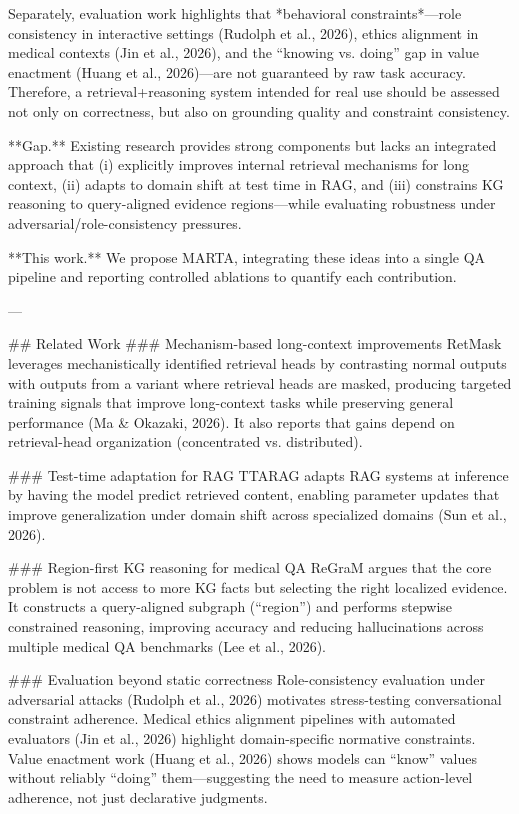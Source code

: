 Separately, evaluation work highlights that *behavioral constraints*—role consistency in interactive settings (Rudolph et al., 2026), ethics alignment in medical contexts (Jin et al., 2026), and the “knowing vs. doing” gap in value enactment (Huang et al., 2026)—are not guaranteed by raw task accuracy. Therefore, a retrieval+reasoning system intended for real use should be assessed not only on correctness, but also on grounding quality and constraint consistency.

**Gap.** Existing research provides strong components but lacks an integrated approach that (i) explicitly improves internal retrieval mechanisms for long context, (ii) adapts to domain shift at test time in RAG, and (iii) constrains KG reasoning to query-aligned evidence regions—while evaluating robustness under adversarial/role-consistency pressures.

**This work.** We propose MARTA, integrating these ideas into a single QA pipeline and reporting controlled ablations to quantify each contribution.

---

## Related Work  
### Mechanism-based long-context improvements  
RetMask leverages mechanistically identified retrieval heads by contrasting normal outputs with outputs from a variant where retrieval heads are masked, producing targeted training signals that improve long-context tasks while preserving general performance (Ma & Okazaki, 2026). It also reports that gains depend on retrieval-head organization (concentrated vs. distributed).

### Test-time adaptation for RAG  
TTARAG adapts RAG systems at inference by having the model predict retrieved content, enabling parameter updates that improve generalization under domain shift across specialized domains (Sun et al., 2026).

### Region-first KG reasoning for medical QA  
ReGraM argues that the core problem is not access to more KG facts but selecting the right localized evidence. It constructs a query-aligned subgraph (“region”) and performs stepwise constrained reasoning, improving accuracy and reducing hallucinations across multiple medical QA benchmarks (Lee et al., 2026).

### Evaluation beyond static correctness  
Role-consistency evaluation under adversarial attacks (Rudolph et al., 2026) motivates stress-testing conversational constraint adherence. Medical ethics alignment pipelines with automated evaluators (Jin et al., 2026) highlight domain-specific normative constraints. Value enactment work (Huang et al., 2026) shows models can “know” values without reliably “doing” them—suggesting the need to measure action-level adherence, not just declarative judgments.

